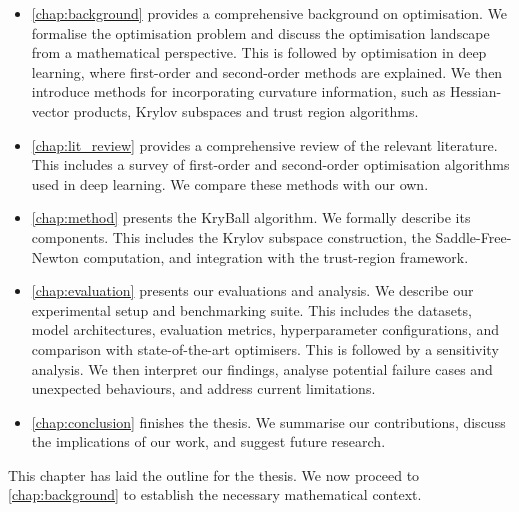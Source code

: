 \begin{itemize}
    \item \cref{chap:background} provides a comprehensive background on optimisation. We formalise the optimisation problem and discuss the optimisation landscape from a mathematical perspective. This is followed by optimisation in deep learning, where first-order and second-order methods are explained. We then introduce methods for incorporating curvature information, such as Hessian-vector products, Krylov subspaces and trust region algorithms.
    \item \cref{chap:lit_review} provides a comprehensive review of the relevant literature. This includes a survey of first-order and second-order optimisation algorithms used in deep learning. We compare these methods with our own.
    \item \cref{chap:method} presents the KryBall algorithm. We formally describe its components. This includes the Krylov subspace construction, the Saddle-Free-Newton computation, and integration with the trust-region framework.
    \item \cref{chap:evaluation} presents our evaluations and analysis. We describe our experimental setup and benchmarking suite. This includes the datasets, model architectures, evaluation metrics, hyperparameter configurations, and comparison with state-of-the-art optimisers. This is followed by a sensitivity analysis. We then interpret our findings, analyse potential failure cases and unexpected behaviours, and address current limitations. 
    \item \cref{chap:conclusion} finishes the thesis. We summarise our contributions, discuss the implications of our work, and suggest future research.
\end{itemize}

This chapter has laid the outline for the thesis. We now proceed to \cref{chap:background} to establish the necessary mathematical context.